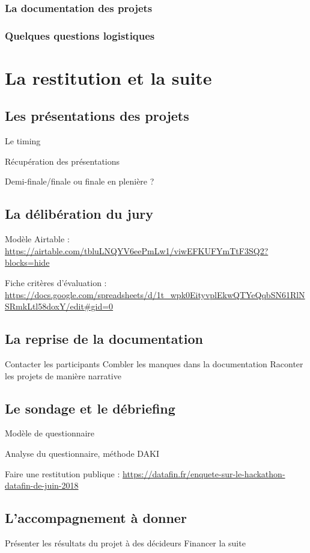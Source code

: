 \documentclass[]{book}
\begin{document}
\subsection{La documentation des
projets}\label{la-documentation-des-projets}

\subsection{Quelques questions
logistiques}\label{quelques-questions-logistiques}

\chapter{La restitution et la suite}\label{restitution}

\section{Les présentations des
projets}\label{les-presentations-des-projets}

Le timing

Récupération des présentations

Demi-finale/finale ou finale en plenière ?

\section{La délibération du jury}\label{la-deliberation-du-jury}

Modèle Airtable :
\url{https://airtable.com/tbluLNQYV6eePmLw1/viwEFKUFYmTtF3SQ2?blocks=hide}

Fiche critères d'évaluation :
\url{https://docs.google.com/spreadsheets/d/1t_wpk0EityvplEkwQTYeQqbSN61RlNSRmkLtl58doxY/edit\#gid=0}

\section{La reprise de la
documentation}\label{la-reprise-de-la-documentation}

Contacter les participants Combler les manques dans la documentation
Raconter les projets de manière narrative

\section{Le sondage et le débriefing}\label{le-sondage-et-le-debriefing}

Modèle de questionnaire

Analyse du questionnaire, méthode DAKI

Faire une restitution publique :
\url{https://datafin.fr/enquete-sur-le-hackathon-datafin-de-juin-2018}

\section{L'accompagnement à donner}\label{laccompagnement-a-donner}

Présenter les résultats du projet à des décideurs Financer la suite


\end{document}
